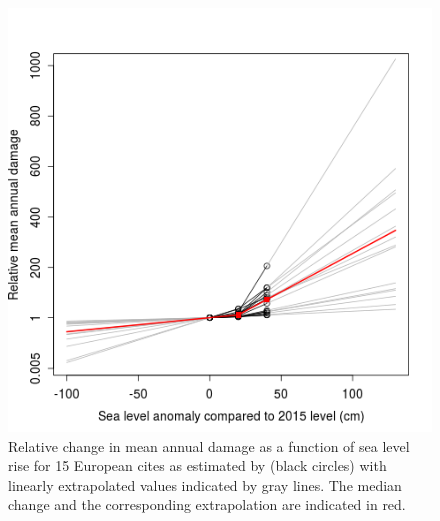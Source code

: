 \documentclass[draft,linenumbers]{agujournal}
\begin{document}
\begin{figure}
\begin{center}
\includegraphics[width=\linewidth]{EuropeanIncreaseLossExtrapolationUncertainty.png}
\caption{ Relative change in mean annual damage as a function of sea level rise for 15 European cites as estimated by \cite{Hallegatte&2013} (black circles) with linearly extrapolated values indicated by gray lines. The median change and the corresponding extrapolation are indicated in red.}
\label{fig:ChangeInDamage}
\end{center}
\end{figure}
\end{document}
